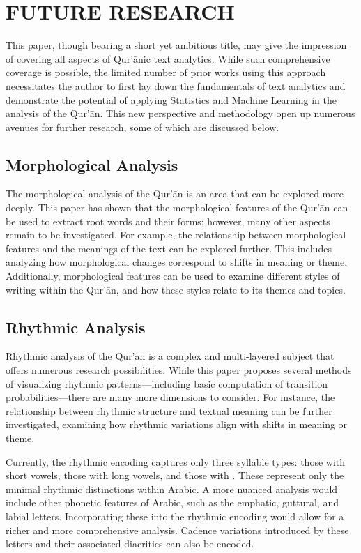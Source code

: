 \chapter{FUTURE RESEARCH}\label{ch:future_research}

This paper, though bearing a short yet ambitious title, may give the impression of covering all aspects of Qur'\=anic text analytics. While such comprehensive coverage is possible, the limited number of prior works using this approach necessitates the author to first lay down the fundamentals of text analytics and demonstrate the potential of applying Statistics and Machine Learning in the analysis of the Qur'\=an. This new perspective and methodology open up numerous avenues for further research, some of which are discussed below.

\section{Morphological Analysis}

The morphological analysis of the Qur'\=an is an area that can be explored more deeply. This paper has shown that the morphological features of the Qur'\=an can be used to extract root words and their forms; however, many other aspects remain to be investigated. For example, the relationship between morphological features and the meanings of the text can be explored further. This includes analyzing how morphological changes correspond to shifts in meaning or theme. Additionally, morphological features can be used to examine different styles of writing within the Qur'\=an, and how these styles relate to its themes and topics.

\section{Rhythmic Analysis}

Rhythmic analysis of the Qur'\=an is a complex and multi-layered subject that offers numerous research possibilities. While this paper proposes several methods of visualizing rhythmic patterns—including basic computation of transition probabilities—there are many more dimensions to consider. For instance, the relationship between rhythmic structure and textual meaning can be further investigated, examining how rhythmic variations align with shifts in meaning or theme.

Currently, the rhythmic encoding captures only three syllable types: those with short vowels, those with long vowels, and those with  . These represent only the minimal rhythmic distinctions within Arabic. A more nuanced analysis would include other phonetic features of Arabic, such as the emphatic, guttural, and labial letters. Incorporating these into the rhythmic encoding would allow for a richer and more comprehensive analysis. Cadence variations introduced by these letters and their associated diacritics can also be encoded.

